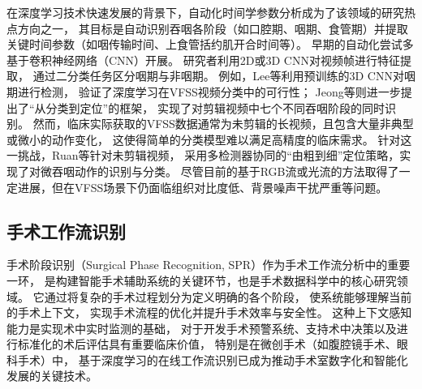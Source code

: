 在深度学习技术快速发展的背景下，自动化时间学参数分析成为了该领域的研究热点方向之一\cite{sanjeevi2025artificial}，
其目标是自动识别吞咽各阶段（如口腔期、咽期、食管期）并提取关键时间参数（如咽传输时间、上食管括约肌开合时间等）。
早期的自动化尝试多基于卷积神经网络（CNN）开展。
研究者利用2D或3D CNN对视频帧进行特征提取，
通过二分类任务区分咽期与非咽期\cite{lee2019automatic,bandini2021effect,jeong2023application}。
例如，Lee等\cite{lee2019automatic}利用预训练的3D CNN对咽期进行检测，
验证了深度学习在VFSS视频分类中的可行性；
Jeong等\cite{jeong2023application}则进一步提出了“从分类到定位”的框架，
实现了对剪辑视频中七个不同吞咽阶段的同时识别。
然而，临床实际获取的VFSS数据通常为未剪辑的长视频，且包含大量非典型或微小的动作变化，
这使得简单的分类模型难以满足高精度的临床需求。
针对这一挑战，Ruan等\cite{ruan2023temporal}针对未剪辑视频，
采用多检测器协同的“由粗到细”定位策略，实现了对微吞咽动作的识别与分类。
尽管目前的基于RGB流或光流的方法取得了一定进展，但在VFSS场景下仍面临组织对比度低、背景噪声干扰严重等问题。

\subsection{手术工作流识别}
手术阶段识别（Surgical Phase Recognition, SPR）作为手术工作流分析中的重要一环，
是构建智能手术辅助系统的关键环节，也是手术数据科学中的核心研究领域。
它通过将复杂的手术过程划分为定义明确的各个阶段，
使系统能够理解当前的手术上下文，
实现手术流程的优化并提升手术效率与安全性。
这种上下文感知能力是实现术中实时监测的基础，
对于开发手术预警系统、支持术中决策以及进行标准化的术后评估具有重要临床价值，
特别是在微创手术（如腹腔镜手术、眼科手术）中，
基于深度学习的在线工作流识别已成为推动手术室数字化和智能化发展的关键技术\cite{liu2025deep}。

